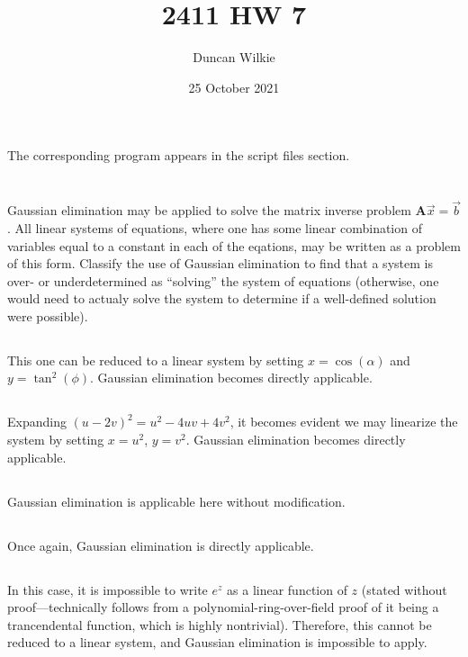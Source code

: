 \documentclass{article}
\title{2411 HW 7}
\author{Duncan Wilkie}
\date{25 October 2021}
\begin{document}
\section{}
The corresponding program appears in the script files section.

\section{}
Gaussian elimination may be applied to solve the matrix inverse problem $\mathbf{A}\vec{x}=\vec{b}$. All linear systems of equations, where one has some linear combination of variables equal to a constant in each of the eqations, may be written as a problem of this form. Classify the use of Gaussian elimination to find that a system is over- or underdetermined as ``solving'' the system of equations (otherwise, one would need to actualy solve the system to determine if a well-defined solution were possible).
\subsection{}
This one can be reduced to a linear system by setting $x = \cos(\alpha)$ and $y = \tan^2(\phi)$. Gaussian elimination becomes directly applicable.
\subsection{}
Expanding $(u-2v)^2=u^2-4uv+4v^2$, it becomes evident we may linearize the system by setting $x = u^2$, $y=v^2$. Gaussian elimination becomes directly applicable.
\subsection{}
Gaussian elimination is applicable here without modification.
\subsection{}
Once again, Gaussian elimination is directly applicable.
\subsection{}
In this case, it is impossible to write $e^z$ as a linear function of $z$ (stated without proof---technically follows from a polynomial-ring-over-field proof of it being a trancendental function, which is highly nontrivial). Therefore, this cannot be reduced to a linear system, and Gaussian elimination is impossible to apply.
\end{document}
